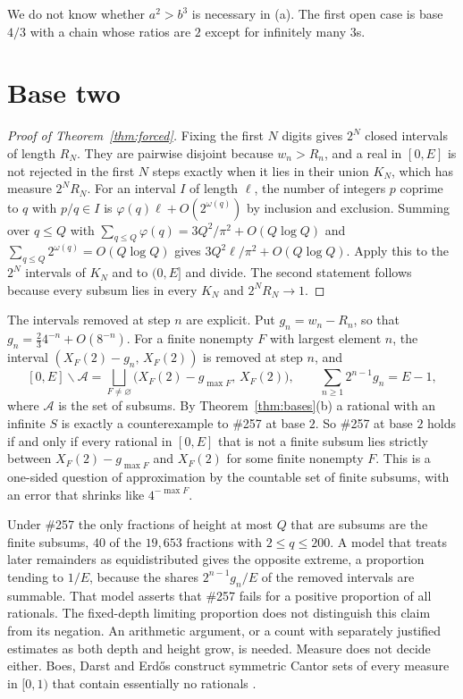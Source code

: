 \documentclass[11pt]{article}
\begin{document}
We do not know whether $a^2>b^3$ is necessary in (a).  The first open case is
base $4/3$ with a chain whose ratios are $2$ except for infinitely many $3$s.

\section{Base two}\label{sec:base2}

\begin{proof}[Proof of Theorem~\ref{thm:forced}]
Fixing the first $N$ digits gives $2^N$ closed intervals of length $R_N$.
They are pairwise disjoint because $w_n>R_n$, and a real in $[0,E]$ is not
rejected in the first $N$ steps exactly when it lies in their union $K_N$,
which has measure $2^NR_N$.  For an interval $I$ of length $\ell$, the number
of integers $p$ coprime to $q$ with $p/q\in I$ is
$\varphi(q)\ell+O(2^{\omega(q)})$ by inclusion and exclusion.  Summing over
$q\le Q$ with $\sum_{q\le Q}\varphi(q)=3Q^2/\pi^2+O(Q\log Q)$ and
$\sum_{q\le Q}2^{\omega(q)}=O(Q\log Q)$ gives $3Q^2\ell/\pi^2+O(Q\log Q)$.
Apply this to the $2^N$ intervals of $K_N$ and to $(0,E]$ and divide.  The
second statement follows because every subsum lies in every $K_N$ and
$2^NR_N\to1$.
\end{proof}

The intervals removed at step $n$ are explicit.  Put $g_n=w_n-R_n$, so that
$g_n=\tfrac23 4^{-n}+O(8^{-n})$.  For a finite nonempty $F$ with largest element
$n$, the interval $(X_F(2)-g_n,\,X_F(2))$ is removed at step $n$, and
\[
 [0,E]\smallsetminus\mathcal A=\bigsqcup_{F\ne\varnothing}\bigl(X_F(2)-g_{\max F},\,X_F(2)\bigr),
 \qquad\sum_{n\ge1}2^{n-1}g_n=E-1,
\]
where $\mathcal A$ is the set of subsums.  By Theorem~\ref{thm:bases}(b) a
rational with an infinite $S$ is exactly a counterexample to \#257 at base $2$.
So \#257 at base $2$ holds if and only if every rational in $[0,E]$ that is not
a finite subsum lies strictly between $X_F(2)-g_{\max F}$ and $X_F(2)$ for some
finite nonempty $F$.
This is a one-sided question of approximation by the countable set of finite
subsums, with an error that shrinks like $4^{-\max F}$.

Under \#257 the only fractions of height at most $Q$ that are subsums are the
finite subsums, $40$ of the $19{,}653$ fractions with $2\le q\le200$.  A model
that treats later remainders as equidistributed gives the opposite extreme, a
proportion tending to $1/E$, because the shares $2^{n-1}g_n/E$ of the removed
intervals are summable.  That model asserts that \#257 fails for a
positive proportion of all rationals.  The fixed-depth limiting proportion does
not distinguish this claim from its negation.  An arithmetic argument, or a
count with separately justified estimates as both depth and height grow, is needed.
Measure does not decide either.  Boes, Darst and Erd\H{o}s construct symmetric
Cantor sets of every measure in $[0,1)$ that contain essentially no rationals
\cite{boesdarsterdos1981}.
\end{document}
